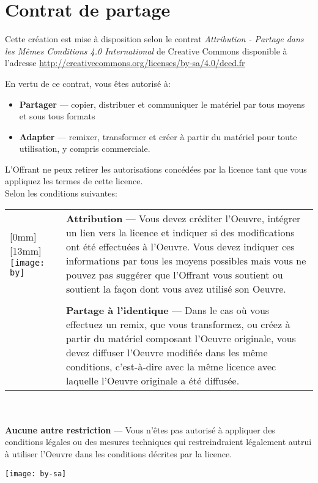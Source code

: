 \chapter*{Contrat de partage} %

Cette création est mise à disposition selon le contrat
\emph{Attribution - Partage dans les Mêmes Conditions 4.0 International}
de Creative Commons disponible à l'adresse
\url{http://creativecommons.org/licenses/by-sa/4.0/deed.fr}

En vertu de ce contrat, vous êtes autorisé à:
\begin{itemize}
\item \textbf{Partager} --- copier, distribuer et communiquer le
  matériel par tous moyens et sous tous formats
\item \textbf{Adapter} --- remixer, transformer et créer à partir du
  matériel pour toute utilisation, y compris commerciale.
\end{itemize}

L'Offrant ne peux retirer les autorisations concédées par la
licence tant que vous appliquez les termes de cette licence. \\

Selon les conditions suivantes:\\

  \begin{tabularx}{\linewidth}{@{}lX@{}}
    \raisebox{-9mm}[0mm][13mm]{%
      \texttt{[image: by]}} &
    \textbf{Attribution} --- Vous devez créditer l'Oeuvre, intégrer un lien vers la licence et indiquer si des modifications ont été effectuées à l'Oeuvre. Vous devez indiquer ces informations par tous les moyens possibles mais vous ne pouvez pas suggérer que l'Offrant vous soutient ou soutient la façon dont vous avez utilisé son Oeuvre. \\ \\
    \raisebox{-9mm}{\texttt{[image: sa]}}
    & \textbf{Partage à l'identique} --- Dans le cas où vous effectuez
    un remix, que vous transformez, ou créez à partir du matériel
    composant l'Oeuvre originale, vous devez diffuser l'Oeuvre
    modifiée dans les même conditions, c'est-à-dire avec la même
    licence avec laquelle l'Oeuvre originale a été diffusée.
  \end{tabularx} \\ \\
  \textbf{Aucune autre restriction} --- Vous n'êtes pas autorisé à
  appliquer des conditions légales ou des mesures techniques qui
  restreindraient légalement autrui à utiliser l'Oeuvre dans les
  conditions décrites par la licence.

  \begin{center}
    \texttt{[image: by-sa]}\\%
  \end{center}

